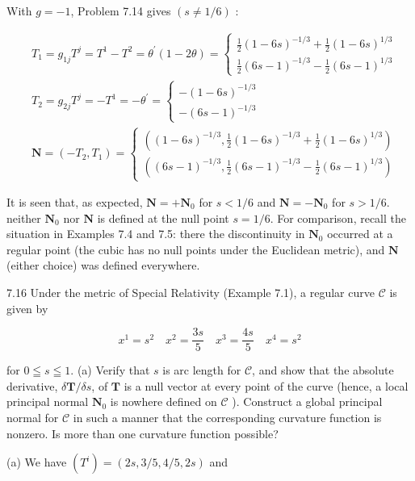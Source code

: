 \documentclass[10pt]{article}
\begin{document}
With $g=-1$, Problem 7.14 gives $(s \neq 1 / 6)$ :

$$
\begin{aligned}
& T_{1}=g_{1 j} T^{j}=T^{1}-T^{2}=\theta^{\prime}(1-2 \theta)=\left\{\begin{array}{l}
\frac{1}{2}(1-6 s)^{-1 / 3}+\frac{1}{2}(1-6 s)^{1 / 3} \\
\frac{1}{2}(6 s-1)^{-1 / 3}-\frac{1}{2}(6 s-1)^{1 / 3}
\end{array}\right. \\
& T_{2}=g_{2 j} T^{j}=-T^{1}=-\theta^{\prime}=\left\{\begin{array}{l}
-(1-6 s)^{-1 / 3} \\
-(6 s-1)^{-1 / 3}
\end{array}\right. \\
& \mathbf{N}=\left(-T_{2}, T_{1}\right)=\left\{\begin{array}{l}
\left((1-6 s)^{-1 / 3}, \frac{1}{2}(1-6 s)^{-1 / 3}+\frac{1}{2}(1-6 s)^{1 / 3}\right) \\
\left((6 s-1)^{-1 / 3}, \frac{1}{2}(6 s-1)^{-1 / 3}-\frac{1}{2}(6 s-1)^{1 / 3}\right)
\end{array}\right.
\end{aligned}
$$

It is seen that, as expected, $\mathbf{N}=+\mathbf{N}_{0}$ for $s<1 / 6$ and $\mathbf{N}=-\mathbf{N}_{0}$ for $s>1 / 6$. neither $\mathbf{N}_{0}$ nor $\mathbf{N}$ is defined at the null point $s=1 / 6$. For comparison, recall the situation in Examples 7.4 and 7.5: there the discontinuity in $\mathbf{N}_{0}$ occurred at a regular point (the cubic has no null points under the Euclidean metric), and $\mathbf{N}$ (either choice) was defined everywhere.

7.16 Under the metric of Special Relativity (Example 7.1), a regular curve $\mathscr{C}$ is given by

$$
x^{1}=s^{2} \quad x^{2}=\frac{3 s}{5} \quad x^{3}=\frac{4 s}{5} \quad x^{4}=s^{2}
$$

for $0 \leqq s \leqq 1$. (a) Verify that $s$ is arc length for $\mathscr{C}$, and show that the absolute derivative, $\delta \mathbf{T} / \delta s$, of $\mathbf{T}$ is a null vector at every point of the curve (hence, a local principal normal $\mathbf{N}_{0}$ is nowhere defined on $\mathscr{C}$ ). Construct a global principal normal for $\mathscr{C}$ in such a manner that the corresponding curvature function is nonzero. Is more than one curvature function possible?

(a) We have $\left(T^{i}\right)=(2 s, 3 / 5,4 / 5,2 s)$ and
\end{document}
